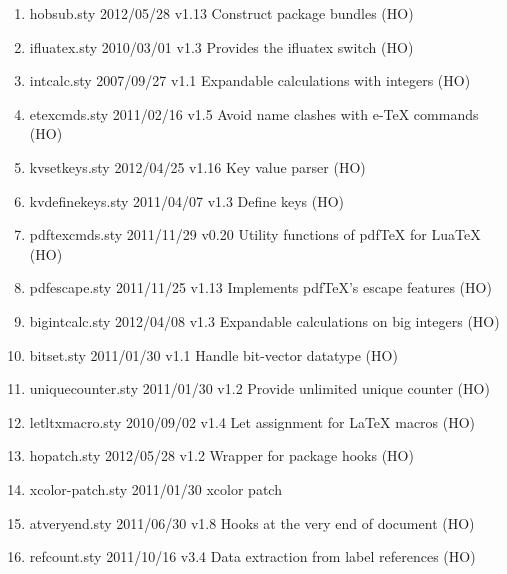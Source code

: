 \begin{enumerate}
\item hobsub.sty 2012/05/28 v1.13 Construct package bundles (HO)
\item ifluatex.sty 2010/03/01 v1.3 Provides the ifluatex switch (HO)
\item intcalc.sty 2007/09/27 v1.1 Expandable calculations with integers (HO)
\item etexcmds.sty 2011/02/16 v1.5 Avoid name clashes with e-TeX commands (HO)
\item kvsetkeys.sty 2012/04/25 v1.16 Key value parser (HO)
\item kvdefinekeys.sty 2011/04/07 v1.3 Define keys (HO)
\item pdftexcmds.sty 2011/11/29 v0.20 Utility functions of pdfTeX for LuaTeX (HO)
\item pdfescape.sty 2011/11/25 v1.13 Implements pdfTeX's escape features (HO)
\item bigintcalc.sty  2012/04/08 v1.3 Expandable calculations on big integers (HO)
\item bitset.sty 2011/01/30 v1.1 Handle bit-vector datatype (HO)
\item uniquecounter.sty 2011/01/30 v1.2 Provide unlimited unique counter (HO)
\item letltxmacro.sty 2010/09/02 v1.4 Let assignment for LaTeX macros (HO)
\item hopatch.sty 2012/05/28 v1.2 Wrapper for package hooks (HO)
\item xcolor-patch.sty 2011/01/30 xcolor patch
\item atveryend.sty 2011/06/30 v1.8 Hooks at the very end of document (HO)
\item refcount.sty 2011/10/16 v3.4 Data extraction from label references (HO)

\end{enumerate}
